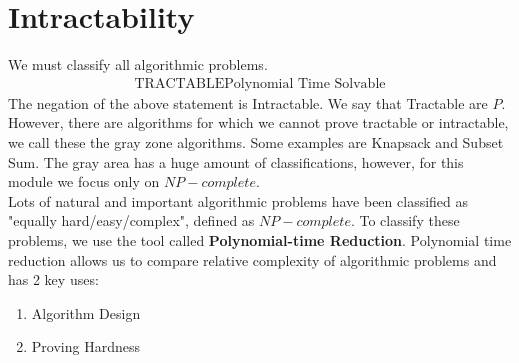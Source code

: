 \documentclass[a4paper]{article}
\theoremstyle{plain}
\newcommand*{\MyDef}{\mathrm{def}}
\newcommand*{\eqdef}{\ensuremath{\mathop{\overset{\MyDef}{=}}}}
\theoremstyle{definition}
\theoremstyle{remark}
\begin{document}
\section{Intractability}
We must classify all algorithmic problems. 
\begin{align*}
	\text{TRACTABLE} \eqdef \text{Polynomial Time Solvable}
\end{align*}
The negation of the above statement is Intractable. We say that Tractable are $P$. However, there are algorithms for which we cannot prove tractable or intractable, we call these the gray zone algorithms. Some examples are Knapsack and Subset Sum. The gray area has a huge amount of classifications, however, for this module we focus only on $NP-complete$. \\
Lots of natural and important algorithmic problems have been classified as "equally hard/easy/complex", defined as $NP-complete$. To classify these problems, we use the tool called \textbf{Polynomial-time Reduction}. Polynomial time reduction allows us to compare relative complexity of algorithmic problems and has 2 key uses:
\begin{enumerate}
	\item Algorithm Design
	\item Proving Hardness
\end{enumerate}
\end{document}
